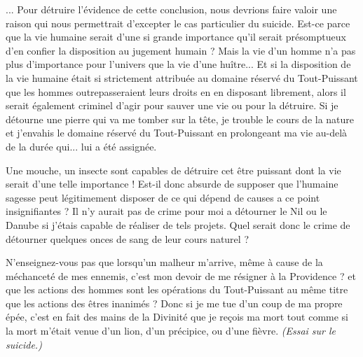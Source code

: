 ... Pour détruire l'évidence de cette conclusion, nous
devrions faire valoir une raison qui nous permettrait
d'excepter le cas particulier du suicide. Est-ce parce que
la vie humaine serait d'une si grande importance qu'il
serait présomptueux d'en confier la disposition au jugement
humain ? Mais la vie d'un homme n'a pas plus
d’importance pour l’univers que la vie d’une huître... Et
si la disposition de la vie humaine était si strictement
attribuée au domaine réservé du Tout-Puissant que les
hommes outrepasseraient leurs droits en en disposant
librement, alors il serait également criminel d’agir pour
sauver une vie ou pour la détruire. Si je détourne une
pierre qui va me tomber sur la tête, je trouble le cours de
la nature et j’envahis le domaine réservé du Tout-Puissant
en prolongeant ma vie au-delà de la durée qui... lui a été
assignée.

Une mouche, un insecte sont capables de détruire cet
être puissant dont la vie serait d’une telle importance !
Est-il donc absurde de supposer que l’humaine sagesse
peut légitimement disposer de ce qui dépend de causes
a ce point insignifiantes ? Il n’y aurait pas de crime pour
moi a détourner le Nil ou le Danube si j’étais capable de
réaliser de tels projets. Quel serait donc le crime de détourner
quelques onces de sang de leur cours naturel ?

N’enseignez-vous pas que lorsqu’un malheur m’arrive,
même à cause de la méchanceté de mes ennemis, c’est
mon devoir de me résigner à la Providence ? et que les
actions des hommes sont les opérations du Tout-Puissant
au même titre que les actions des êtres inanimés ? Donc
si je me tue d’un coup de ma propre épée, c’est en fait des
mains de la Divinité que je reçois ma mort tout comme si
la mort m’était venue d’un lion, d’un précipice, ou d’une
fièvre. {\it (Essai sur le suicide.)} 

